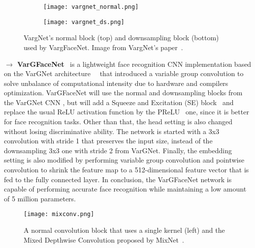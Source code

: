 \documentclass[class=report, crop=false, a4paper, 12pt]{standalone}
\begin{document}
\vspace{0.7\baselineskip}
\begin{figure}[H]
    \centering
    \begin{subfigure}{\textwidth}
        \centering
        \texttt{[image: vargnet\_normal.png]}
    \end{subfigure}
    
    \begin{subfigure}{\textwidth}
        \centering
        \texttt{[image: vargnet\_ds.png]}
    \end{subfigure}
    
    \caption{VargNet's normal block (top) and downsampling block (bottom)~\autocite{zhangVarGNetVariableGroup2020} used by VargFaceNet. Image from VargNet's paper~\autocite{zhangVarGNetVariableGroup2020}.}
    \label{fig:vargnet}
\end{figure}

\noindent\textbf{$\rightarrow$ VarGFaceNet}~\autocite{yanVarGFaceNetEfficientVariable2019} is a lightweight face recognition CNN implementation based on the VarGNet architecture~\autocite{zhangVarGNetVariableGroup2020}~\autocite{chenMobileFaceNetsEfficientCNNs2018} that introduced a variable group convolution to solve unbalance of computational intensity due to hardware and compilers optimization. VarGFaceNet will use the normal and downsampling blocks from the VarGNet CNN , but will add a Squeeze and Excitation (SE) block~\autocite{huSqueezeandExcitationNetworks2019} and replace the usual ReLU activation function by the PReLU~\autocite{heDelvingDeepRectifiers2015} one, since it is better for face recognition tasks. Other than that, the head setting is also changed without losing discriminative ability. The network is started with a 3x3 convolution with stride 1 that preserves the input size, instead of the downsampling 3x3 one with stride 2 from VarGNet. Finally, the embedding setting is also modified by performing variable group convolution and pointwise convolution to shrink the feature map to a 512-dimensional feature vector that is fed to the fully connected layer. In conclusion, the VarGFaceNet network is capable of performing accurate face recognition while maintaining a low amount of 5 million parameters.

\vspace{0.7\baselineskip}
\begin{figure}[H]
    \centering
    \texttt{[image: mixconv.png]}
    \caption{A normal convolution block that uses a single kernel (left) and the Mixed Depthwise Convolution proposed by MixNet~\autocite{tanMixConvMixedDepthwise}.}
    \label{fig:mixconv}
\end{figure}
\end{document}
